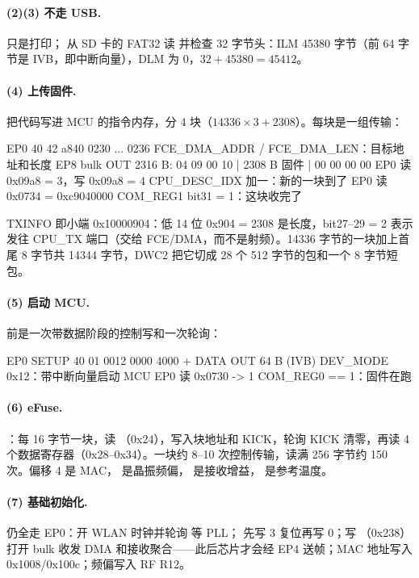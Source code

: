 \paragraph{(2)(3) 不走 USB.}  只是打印； 从 SD 卡的 FAT32 读  并检查 32 字节头：ILM 45380 字节（前 64 字节是 IVB，即中断向量），DLM 为 0，$32+45380=45412$。

\paragraph{(4) 上传固件.}  把代码写进 MCU 的指令内存，分 4 块（$14336\times 3 + 2308$）。每块是一组传输：
\begin{txtcode}
EP0  40 42 a840 0230 ... 0236   FCE_DMA_ADDR / FCE_DMA_LEN：目标地址和长度
EP8  bulk OUT 2316 B:  04 09 00 10 | 2308 B 固件 | 00 00 00 00
EP0  读 0x09a8 = 3，写 0x09a8 = 4   CPU_DESC_IDX 加一：新的一块到了
EP0  读 0x0734 = 0xc9040000        COM_REG1 bit31 = 1：这块收完了
\end{txtcode}
TXINFO  即小端 0x10000904：低 14 位 0x904 = 2308 是长度，bit27--29 = 2 表示发往 CPU\_TX 端口（交给 FCE/DMA，而不是射频）。14336 字节的一块加上首尾 8 字节共 14344 字节，DWC2 把它切成 28 个 512 字节的包和一个 8 字节短包。

\paragraph{(5) 启动 MCU.}  前是一次带数据阶段的控制写和一次轮询：
\begin{txtcode}
EP0  SETUP 40 01 0012 0000 4000 + DATA OUT 64 B (IVB)   DEV_MODE 0x12：带中断向量启动 MCU
EP0  读 0x0730 -> 1                                     COM_REG0 == 1：固件在跑
\end{txtcode}

\paragraph{(6) eFuse.} ：每 16 字节一块，读 （0x24），写入块地址和 KICK，轮询 KICK 清零，再读 4 个数据寄存器（0x28--0x34）。一块约 8--10 次控制传输，读满 256 字节约 150 次。偏移 4 是 MAC， 是晶振频偏， 是接收增益， 是参考温度。

\paragraph{(7) 基础初始化.}  仍全走 EP0：开 WLAN 时钟并轮询  等 PLL； 先写 3 复位再写 0；写 （0x238）打开 bulk 收发 DMA 和接收聚合——此后芯片才会经 EP4 送帧；MAC 地址写入 0x1008/0x100c；频偏写入 RF R12。

